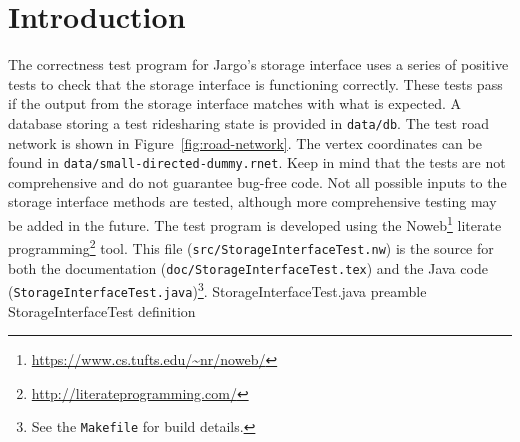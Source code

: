 \documentclass{article}
\def\nwendcode{\endtrivlist \endgroup}
\let\nwdocspar=\par
\begin{document}
\section{Introduction}
\label{sec:introduction}
The correctness test program for Jargo's storage interface uses a series of
positive tests to check that the storage interface is functioning correctly.
These tests pass if the output from the storage interface matches with what is
expected. A database storing a test ridesharing state is provided in
{\tt{}data/db}.  The test road network is shown in Figure~\ref{fig:road-network}.
The vertex coordinates can be found in {\tt{}data/small-directed-dummy.rnet}.
Keep in mind that the tests are not comprehensive and do not guarantee bug-free
code. Not all possible inputs to the storage interface methods are tested,
although more comprehensive testing may be added in the future.
The test program is developed using the
Noweb\footnote{\url{https://www.cs.tufts.edu/~nr/noweb/}} literate
programming\footnote{\url{http://literateprogramming.com/}} tool.  This file
({\tt{}src/StorageInterfaceTest.nw}) is the source for both the documentation
({\tt{}doc/StorageInterfaceTest.tex}) and the Java code ({\tt{}StorageInterfaceTest.java})\footnote{See the
{\tt{}Makefile} for build details.}.
\endmoddef{}
  \LA{}StorageInterfaceTest.java preamble~{\nwtagstyle{}}\RA{}
  \LA{}\code{}StorageInterfaceTest\edoc{} definition~{\nwtagstyle{}}\RA{}
\nwendcode{}\nwdocspar
\end{document}
